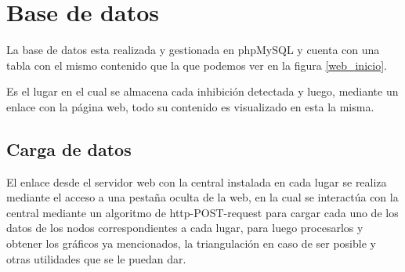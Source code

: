 \section{Base de datos}
La base de datos esta realizada y gestionada en phpMySQL y cuenta con una tabla con el mismo contenido que la que podemos ver en la figura \ref{web_inicio}. \par 
Es el lugar en el cual se almacena cada inhibición detectada y luego, mediante un enlace con la página web, todo su 
contenido es visualizado en esta la misma. 
\subsection{Carga de datos}
\par El enlace desde el servidor web con la central instalada en cada lugar se realiza mediante el acceso a una pestaña oculta de la web, en la cual se interactúa con la central mediante un algoritmo de http-POST-request para cargar cada uno de los datos de los nodos correspondientes a cada lugar, para luego procesarlos y obtener los gráficos ya mencionados, la triangulación en caso de ser posible y otras utilidades que se le puedan dar. 
